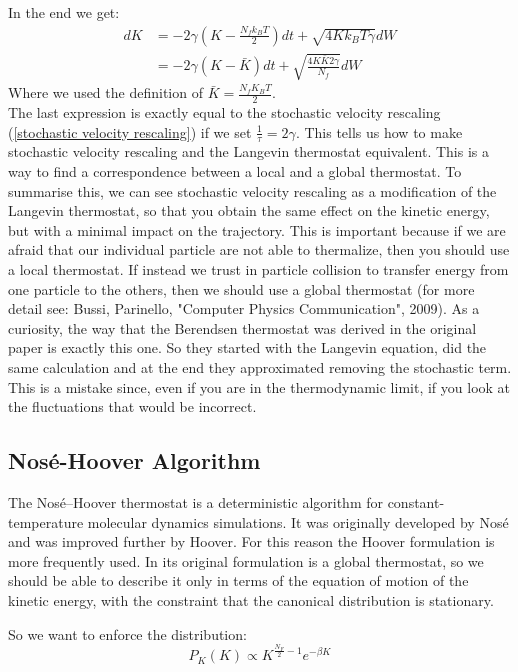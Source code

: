 In the end we get:
\begin{align*}
    dK &= -2\gamma\left( K -\frac{N_f k_B T}{2}\right)dt + \sqrt{4Kk_B T\gamma}dW\\
    &= -2\gamma \left( K -\bar K\right)dt + \sqrt{\frac{4K\bar K 2\gamma}{N_f}}dW
\end{align*}
Where we used the definition of $\bar K = \frac{N_f K_B T}{2}$.\\ The last expression is exactly equal to the stochastic velocity rescaling (\ref{stochastic velocity rescaling}) if we set $\frac{1}{\tau}=2\gamma$. This tells us how to make stochastic velocity rescaling and the Langevin thermostat equivalent.
This is a way to find a correspondence between a local and a global thermostat. To summarise this, we can see stochastic velocity rescaling as a modification of the Langevin thermostat, so that you obtain the same effect on the kinetic energy, but with a minimal impact on the trajectory. This is important because if we are afraid that our individual particle are not able to thermalize, then you should use a local thermostat. If instead we trust in particle collision to transfer energy from one particle to the others, then we should use a global thermostat (for more detail see: Bussi, Parinello, "Computer Physics Communication", 2009).
As a curiosity, the way that the Berendsen thermostat was derived in the original paper is exactly this one. So they started with the Langevin equation, did the same calculation and at the end they approximated removing the stochastic term. This is a mistake since, even if you are in the thermodynamic limit, if you look at the fluctuations that would be incorrect. 

\subsection{Nosé-Hoover Algorithm}

\par The Nosé–Hoover thermostat is a deterministic algorithm for constant-temperature molecular dynamics simulations. It was originally developed by Nosé and was improved further by Hoover. For this reason the Hoover formulation is more frequently used. In its original formulation is a global thermostat, so we should be able to describe it only in terms of the equation of motion of the kinetic energy, with the constraint that the canonical distribution is stationary.

So we want to enforce the distribution:
\begin{equation}
    P_K(K) \propto K^{\frac{N_F}{2} -1}e^{-\beta K}
\end{equation}

